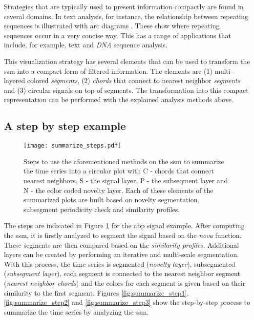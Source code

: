 {Strategies that are typically used to present information compactly are found in several domains. In text analysis, for instance, the relationship between repeating sequences is illustrated with arc diagrams \cite{bitmap, arcplots}. These show where repeating sequences occur in a very concise way. This has a range of applications that include, for example, text and \textit{DNA} sequence analysis.


\par
This visualization strategy has several elements that can be used to transform the \gls{ssm} into a compact form of filtered information. The elements are (1) multi-layered colored \textit{segments}, (2) \textit{chords} that connect to nearest neighbor \textit{segments} and (3) circular signals on top of segments. The transformation into this compact representation can be performed with the explained analysis methods above.

\subsection{A step by step example}

\begin{figure}
\centering
\texttt{[image: summarize\_steps.pdf]}
\caption{Steps to use the aforementioned methods on the \gls{ssm} to summarize the time series into a circular plot with C - chords that connect nearest neighbors, S - the signal layer, P - the subseqment layer and N - the color coded novelty layer. Each of these elements of the summarized plots are built based on novelty segmentation, subsegment periodicity check and similarity profiles.}
\label{fig:summarize_steps}
\end{figure}

The steps are indicated in Figure \ref{fig:summarize_steps} for the \gls{abp} signal example. After computing the \gls{ssm}, it is firstly analyzed to segment the signal based on the \textit{nova} function. These segments are then compared based on the \textit{similarity profiles}. Additional layers can be created by performing an iterative and multi-scale segmentation. With this process, the time series is segmented (\textit{novelty layer}), subsegmented (\textit{subsegment layer}), each segment is connected to the nearest neighbor segment (\textit{nearest neighbor chords}) and the colors for each segment is given based on their similarity to the first segment. Figures \ref{fig:summarize_step1}, \ref{fig:summarize_step2} and \ref{fig:summarize_step3} show the step-by-step process to summarize the time series by analyzing the \gls{ssm}. 

}
